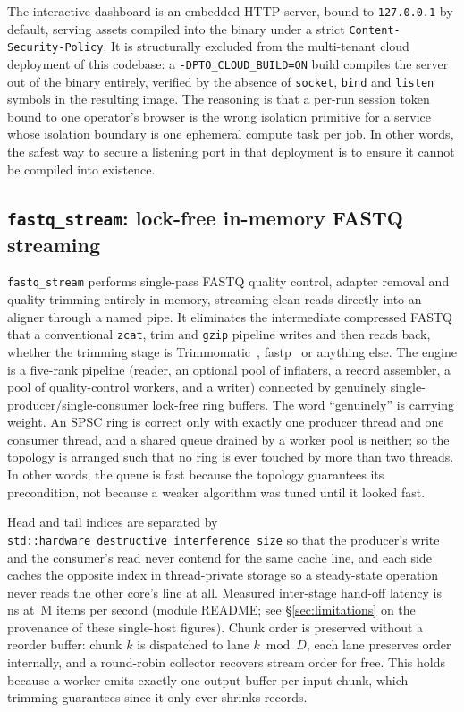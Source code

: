 \documentclass[10pt,twocolumn]{article}
\begin{document}
The interactive dashboard is an embedded HTTP server, bound to
\texttt{127.0.0.1} by default, serving assets compiled into the binary under a
strict \texttt{Content-Security-Policy}. It is structurally excluded from the
multi-tenant cloud deployment of this codebase: a
\texttt{-DPTO\_CLOUD\_BUILD=ON} build compiles the server out of the binary
entirely, verified by the absence of \texttt{socket}, \texttt{bind} and
\texttt{listen} symbols in the resulting image. The reasoning is that a
per-run session token bound to one operator's browser is the wrong isolation
primitive for a service whose isolation boundary is one ephemeral compute
task per job. In other words, the safest way to secure a listening port in
that deployment is to ensure it cannot be compiled into existence.

\subsection{\texttt{fastq\_stream}: lock-free in-memory FASTQ streaming}
\label{sec:fastq-stream}

\texttt{fastq\_stream} performs single-pass FASTQ quality control, adapter
removal and quality trimming entirely in memory, streaming clean reads
directly into an aligner through a named pipe. It eliminates the intermediate
compressed FASTQ that a conventional \texttt{zcat}, trim and \texttt{gzip}
pipeline writes and then reads back, whether the trimming stage is
Trimmomatic~\citep{bolger2014trimmomatic}, fastp~\citep{chen2018fastp} or
anything else. The engine is a five-rank pipeline (reader, an optional pool
of inflaters, a record assembler, a pool of quality-control workers, and a
writer) connected by genuinely single-producer/single-consumer lock-free ring
buffers. The word ``genuinely'' is carrying weight. An SPSC ring is correct
only with exactly one producer thread and one consumer thread, and a shared
queue drained by a worker pool is neither; so the topology is arranged such
that no ring is ever touched by more than two threads. In other words, the
queue is fast because the topology guarantees its precondition, not because a
weaker algorithm was tuned until it looked fast.

Head and tail indices are separated by
\texttt{std::hardware\_destructive\_interference\_size} so that the producer's
write and the consumer's read never contend for the same cache line, and each
side caches the opposite index in thread-private storage so a steady-state
operation never reads the other core's line at all. Measured inter-stage
hand-off latency is \FqSpscLatency{}\,ns at \FqSpscRate{}\,M items per second
(module README; see \S\ref{sec:limitations} on the provenance of these
single-host figures). Chunk order is preserved without a reorder buffer:
chunk $k$ is dispatched to lane $k \bmod D$, each lane preserves order
internally, and a round-robin collector recovers stream order for free. This
holds because a worker emits exactly one output buffer per input chunk, which
trimming guarantees since it only ever shrinks records.
\end{document}
